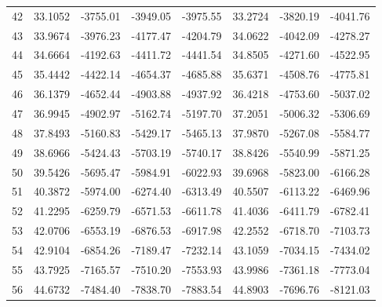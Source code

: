 \begin{table}[]
\begin{tabular}{c|cccc|ccc}
42	&	33.1052	&	-3755.01	&	-3949.05	&	-3975.55	&	33.2724	&	-3820.19	&	-4041.76	\\
43	&	33.9674	&	-3976.23	&	-4177.47	&	-4204.79	&	34.0622	&	-4042.09	&	-4278.27	\\
44	&	34.6664	&	-4192.63	&	-4411.72	&	-4441.54	&	34.8505	&	-4271.60	&	-4522.95	\\
45	&	35.4442	&	-4422.14	&	-4654.37	&	-4685.88	&	35.6371	&	-4508.76	&	-4775.81	\\
46	&	36.1379	&	-4652.44	&	-4903.88	&	-4937.92	&	36.4218	&	-4753.60	&	-5037.02	\\
47	&	36.9945	&	-4902.97	&	-5162.74	&	-5197.70	&	37.2051	&	-5006.32	&	-5306.69	\\
48	&	37.8493	&	-5160.83	&	-5429.17	&	-5465.13	&	37.9870	&	-5267.08	&	-5584.77	\\
49	&	38.6966	&	-5424.43	&	-5703.19	&	-5740.17	&	38.8426	&	-5540.99	&	-5871.25	\\
50	&	39.5426	&	-5695.47	&	-5984.91	&	-6022.93	&	39.6968	&	-5823.00	&	-6166.28	\\
51	&	40.3872	&	-5974.00	&	-6274.40	&	-6313.49	&	40.5507	&	-6113.22	&	-6469.96	\\
52	&	41.2295	&	-6259.79	&	-6571.53	&	-6611.78	&	41.4036	&	-6411.79	&	-6782.41	\\
53	&	42.0706	&	-6553.19	&	-6876.53	&	-6917.98	&	42.2552	&	-6718.70	&	-7103.73	\\
54	&	42.9104	&	-6854.26	&	-7189.47	&	-7232.14	&	43.1059	&	-7034.15	&	-7434.02	\\
55	&	43.7925	&	-7165.57	&	-7510.20	&	-7553.93	&	43.9986	&	-7361.18	&	-7773.04	\\
56	&	44.6732	&	-7484.40	&	-7838.70	&	-7883.54	&	44.8903	&	-7696.76	&	-8121.03	\\

    \hline
     \end{tabular}\label{tab:ground_state_energies}
 \end{table} 
